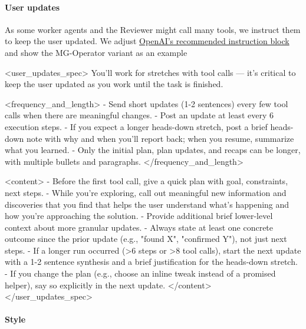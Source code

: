 \documentclass[submission, Phys]{SciPost}
\begin{document}
\paragraph{User updates}

As some worker agents and the Reviewer might call many tools, we instruct them to keep the user updated. We adjust \href{https://cookbook.openai.com/examples/gpt-5/gpt-5-1_prompting_guide#eliciting-user-updates}{OpenAI's recommended instruction block} and show the MG-Operator variant as an example
%
\begin{promptblocklit}
<user_updates_spec>
You'll work for stretches with tool calls — it's critical to keep the user updated as you work until the task is finished.

<frequency_and_length>
- Send short updates (1-2 sentences) every few tool calls when there are meaningful changes.
- Post an update at least every 6 execution steps.
- If you expect a longer heads-down stretch, post a brief heads-down note with why and when you'll report back; when you resume, summarize what you learned.
- Only the initial plan, plan updates, and recaps can be longer, with multiple bullets and paragraphs.
</frequency_and_length>

<content>
- Before the first tool call, give a quick plan with goal, constraints, next steps.
- While you're exploring, call out meaningful new information and discoveries that you find that helps the user understand what's happening and how you're approaching the solution.
- Provide additional brief lower-level context about more granular updates.
- Always state at least one concrete outcome since the prior update (e.g., "found X", "confirmed Y"), not just next steps.
- If a longer run occurred (>6 steps or >8 tool calls), start the next update with a 1-2 sentence synthesis and a brief justification for the heads-down stretch.
- If you change the plan (e.g., choose an inline tweak instead of a promised helper), say so explicitly in the next update.
</content>
</user_updates_spec>
\end{promptblocklit}

\paragraph{Style}
\end{document}
